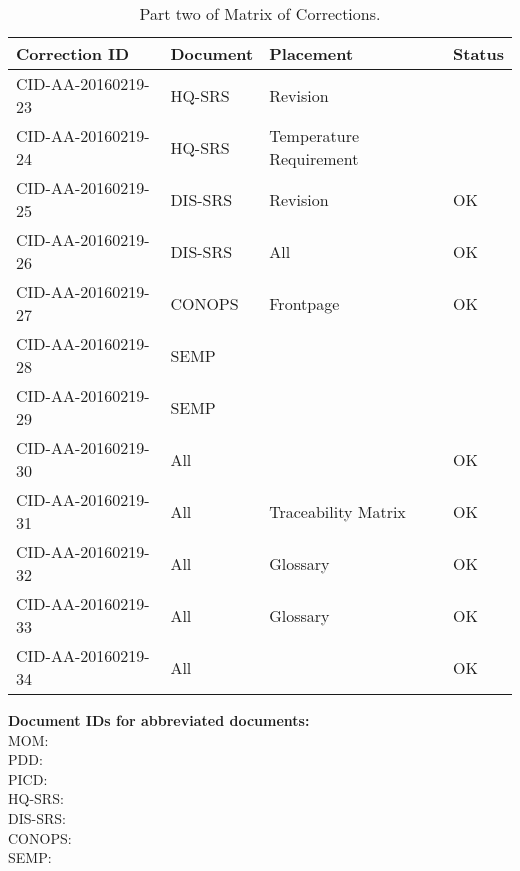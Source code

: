 \begin{table}[ht]
\centering
\begin{tabular}{|>{\centering\arraybackslash}p{4.5cm}|>{\centering\arraybackslash}p{2cm}|>{\centering\arraybackslash}p{3cm}|>{\centering\arraybackslash}p{3cm}|}
\hline \textbf{Correction ID} & \textbf{Document} & \textbf{Placement} & \textbf{Status} \\ 
\hline CID-AA-20160219-23 & HQ-SRS & Revision & \\ 
\hline CID-AA-20160219-24 & HQ-SRS & Temperature Requirement & \\ 
\hline CID-AA-20160219-25 & DIS-SRS & Revision & OK\\ 
\hline CID-AA-20160219-26 & DIS-SRS & All & OK \\ 
\hline CID-AA-20160219-27 & CONOPS & Frontpage & OK \\ 
\hline CID-AA-20160219-28 & SEMP &  & \\ 
\hline CID-AA-20160219-29 & SEMP &  & \\ 
\hline CID-AA-20160219-30 & All &  & OK\\ 
\hline CID-AA-20160219-31 & All & Traceability Matrix & OK\\ 
\hline CID-AA-20160219-32 & All & Glossary & OK\\ 
\hline CID-AA-20160219-33 & All & Glossary & OK\\ 
\hline CID-AA-20160219-34 & All &  & OK\\
\hline 
\end{tabular}
\caption{Part two of Matrix of Corrections.}
\label{tb:MoC2} 
\end{table}

\vspace{20pt}
\noindent \textbf{Document IDs for abbreviated documents:}\\
MOM:        \mom \\
PDD:        \pdd \\
PICD:       \picd \\
HQ-SRS:     \srshq \\
DIS-SRS:    \srsdis \\
CONOPS:     \conops \\
SEMP:       \semp \\

